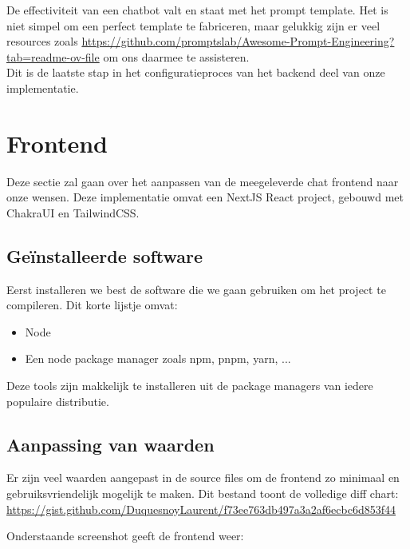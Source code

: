 De effectiviteit van een chatbot valt en staat met het prompt template. 
Het is niet simpel om een perfect template te fabriceren, maar gelukkig zijn er veel resources zoals \url{https://github.com/promptslab/Awesome-Prompt-Engineering?tab=readme-ov-file}
om ons daarmee te assisteren. \\

Dit is de laatste stap in het configuratieproces van het backend deel van onze implementatie. 

\newpage
\section{Frontend}
Deze sectie zal gaan over het aanpassen van de meegeleverde chat frontend naar onze wensen. 
Deze implementatie omvat een NextJS React project, gebouwd met ChakraUI en TailwindCSS. 

\subsection{Geïnstalleerde software}
Eerst installeren we best de software die we gaan gebruiken om het project te compileren. 
Dit korte lijstje omvat:

\begin{itemize}
    \item Node
    \item Een node package manager zoals npm, pnpm, yarn, ... 
\end{itemize}

Deze tools zijn makkelijk te installeren uit de package managers van iedere populaire distributie. 

\subsection{Aanpassing van waarden}
Er zijn veel waarden aangepast in de source files om de frontend zo minimaal en gebruiksvriendelijk mogelijk te maken. 
Dit bestand toont de volledige diff chart: \url{https://gist.github.com/DuquesnoyLaurent/f73ee763db497a3a2af6ecbc6d853f44}

Onderstaande screenshot geeft de frontend weer:
\begin{figure}[h]
\end{figure}

